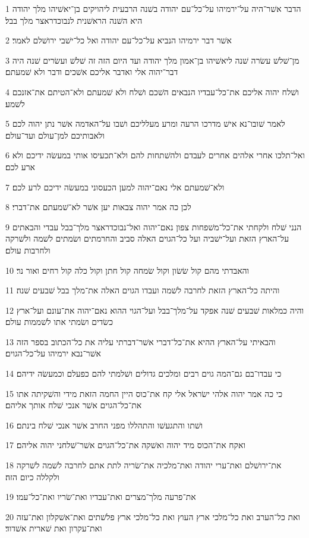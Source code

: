 \par 1 הדבר אשׁר־היה על־ירמיהו על־כל־עם יהודה בשׁנה הרבעית ליהויקים בן־יאשׁיהו מלך יהודה היא השׁנה הראשׁנית לנבוכדראצר מלך בבל׃
\par 2 אשׁר דבר ירמיהו הנביא על־כל־עם יהודה ואל כל־ישׁבי ירושׁלם לאמר׃
\par 3 מן־שׁלשׁ עשׂרה שׁנה ליאשׁיהו בן־אמון מלך יהודה ועד היום הזה זה שׁלשׁ ועשׂרים שׁנה היה דבר־יהוה אלי ואדבר אליכם אשׁכים ודבר ולא שׁמעתם׃
\par 4 ושׁלח יהוה אליכם את־כל־עבדיו הנבאים השׁכם ושׁלח ולא שׁמעתם ולא־הטיתם את־אזנכם לשׁמע׃
\par 5 לאמר שׁובו־נא אישׁ מדרכו הרעה ומרע מעלליכם ושׁבו על־האדמה אשׁר נתן יהוה לכם ולאבותיכם למן־עולם ועד־עולם׃
\par 6 ואל־תלכו אחרי אלהים אחרים לעבדם ולהשׁתחות להם ולא־תכעיסו אותי במעשׂה ידיכם ולא ארע לכם׃
\par 7 ולא־שׁמעתם אלי נאם־יהוה למען הכעסוני במעשׂה ידיכם לרע לכם׃
\par 8 לכן כה אמר יהוה צבאות יען אשׁר לא־שׁמעתם את־דברי׃
\par 9 הנני שׁלח ולקחתי את־כל־משׁפחות צפון נאם־יהוה ואל־נבוכדראצר מלך־בבל עבדי והבאתים על־הארץ הזאת ועל־ישׁביה ועל כל־הגוים האלה סביב והחרמתים ושׂמתים לשׁמה ולשׁרקה ולחרבות עולם׃
\par 10 והאבדתי מהם קול שׂשׂון וקול שׂמחה קול חתן וקול כלה קול רחים ואור נר׃
\par 11 והיתה כל־הארץ הזאת לחרבה לשׁמה ועבדו הגוים האלה את־מלך בבל שׁבעים שׁנה׃
\par 12 והיה כמלאות שׁבעים שׁנה אפקד על־מלך־בבל ועל־הגוי ההוא נאם־יהוה את־עונם ועל־ארץ כשׂדים ושׂמתי אתו לשׁממות עולם׃
\par 13 והבאיתי על־הארץ ההיא את־כל־דברי אשׁר־דברתי עליה את כל־הכתוב בספר הזה אשׁר־נבא ירמיהו על־כל־הגוים׃
\par 14 כי עבדו־בם גם־המה גוים רבים ומלכים גדולים ושׁלמתי להם כפעלם וכמעשׂה ידיהם׃
\par 15 כי כה אמר יהוה אלהי ישׂראל אלי קח את־כוס היין החמה הזאת מידי והשׁקיתה אתו את־כל־הגוים אשׁר אנכי שׁלח אותך אליהם׃
\par 16 ושׁתו והתגעשׁו והתהללו מפני החרב אשׁר אנכי שׁלח בינתם׃
\par 17 ואקח את־הכוס מיד יהוה ואשׁקה את־כל־הגוים אשׁר־שׁלחני יהוה אליהם׃
\par 18 את־ירושׁלם ואת־ערי יהודה ואת־מלכיה את־שׂריה לתת אתם לחרבה לשׁמה לשׁרקה ולקללה כיום הזה׃
\par 19 את־פרעה מלך־מצרים ואת־עבדיו ואת־שׂריו ואת־כל־עמו׃
\par 20 ואת כל־הערב ואת כל־מלכי ארץ העוץ ואת כל־מלכי ארץ פלשׁתים ואת־אשׁקלון ואת־עזה ואת־עקרון ואת שׁארית אשׁדוד׃
